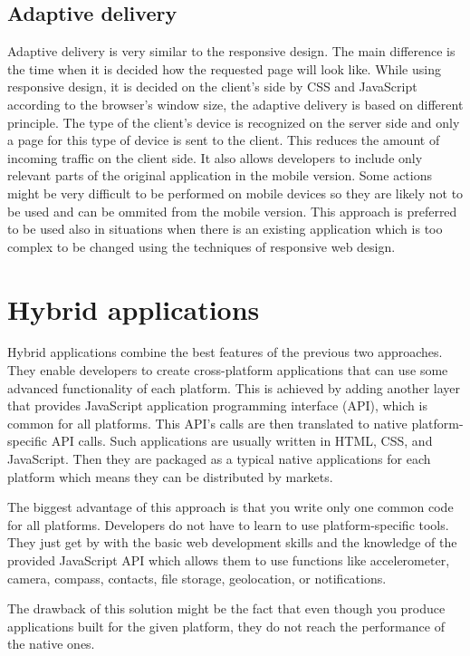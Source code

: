\documentclass[12pt,oneside,final]{fithesis2}
\begin{document}
\subsection{Adaptive delivery}
Adaptive delivery is very similar to the responsive design.
The main difference is the time when it is decided how the requested page will look like.
While using responsive design, it is decided on the client's side by CSS and JavaScript according to the browser's window size, the adaptive delivery is based on different principle.
The type of the client's device is recognized on the server side and only a page for this type of device is sent to the client.
This reduces the amount of incoming traffic on the client side.
It also allows developers to include only relevant parts of the original application in the mobile version.
Some actions might be very difficult to be performed on mobile devices so they are likely not to be used and can be ommited from the mobile version.
This approach is preferred to be used also in situations when there is an existing application which is too complex to be changed using the techniques of responsive web design.

\section{Hybrid applications}
Hybrid applications combine the best features of the previous two approaches.
They enable developers to create cross-platform applications that can use some advanced functionality of each platform.
This is achieved by adding another layer that provides JavaScript application programming interface (API), which is common for all platforms.
This API's calls are then translated to native platform-specific API calls.
Such applications are usually written in HTML, CSS, and JavaScript.
Then they are packaged as a typical native applications for each platform which means they can be distributed by markets.

The biggest advantage of this approach is that you write only one common code for all platforms.
Developers do not have to learn to use platform-specific tools.
They just get by with the basic web development skills and the knowledge of the provided JavaScript API which allows them to use functions like accelerometer, camera, compass, contacts, file storage, geolocation, or notifications.

The drawback of this solution might be the fact that even though you produce applications built for the given platform, they do not reach the performance of the native ones.
\end{document}
